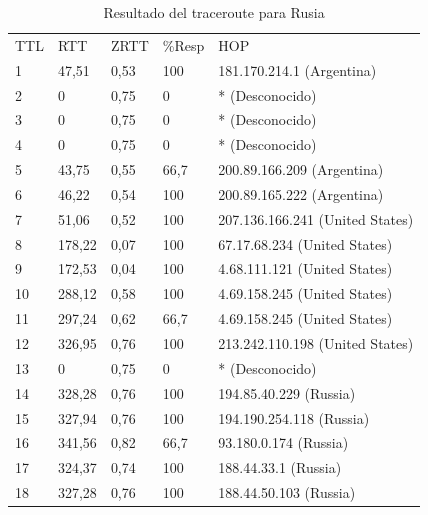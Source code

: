 \begin{table}[H]
  \begin{tabular}{lllll}
     TTL &  RTT      &  ZRTT   &   \%Resp &  HOP              \\
    1  	 &  47,51	   &  0,53	 &   100	  &  181.170.214.1 (Argentina)        \\
    2  	 &  0	       &  0,75	 &   0	    &  * (Desconocido)                  \\
    3  	 &  0	       &  0,75	 &   0	    &  * (Desconocido)                  \\
    4  	 &  0	       &  0,75	 &   0	    &  * (Desconocido)                  \\
    5  	 &  43,75	   &  0,55	 &   66,7	  &  200.89.166.209 (Argentina)       \\
    6  	 &  46,22	   &  0,54	 &   100	  &  200.89.165.222 (Argentina)       \\
    7  	 &  51,06	   &  0,52	 &   100	  &  207.136.166.241 (United States)  \\
    8  	 &  178,22	 &  0,07	 &   100	  &  67.17.68.234 (United States)     \\
    9  	 &  172,53	 &  0,04	 &   100	  &  4.68.111.121 (United States)     \\
    10	 &  288,12	 &  0,58	 &   100	  &  4.69.158.245 (United States)     \\
    11	 &  297,24	 &  0,62	 &   66,7	  &  4.69.158.245 (United States)     \\
    12	 &  326,95	 &  0,76	 &   100	  &  213.242.110.198 (United States)  \\
    13	 &  0	       &  0,75	 &   0	    &  * (Desconocido)                  \\
    14	 &  328,28	 &  0,76	 &   100	  &  194.85.40.229 (Russia)           \\
    15	 &  327,94	 &  0,76	 &   100	  &  194.190.254.118 (Russia)         \\
    16	 &  341,56	 &  0,82	 &   66,7	  &  93.180.0.174 (Russia)            \\
    17	 &  324,37	 &  0,74	 &   100	  &  188.44.33.1 (Russia)             \\
    18	 &  327,28	 &  0,76	 &   100	  &  188.44.50.103 (Russia)           \\
    \end{tabular}
    \caption{Resultado del traceroute para Rusia}
  \label{fig:tabla-rus}
\end{table}

\newpage

